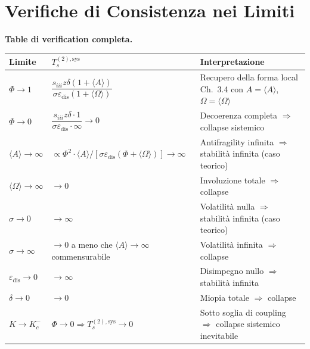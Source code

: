 \section{Verifiche di Consistenza nei
Limiti}\label{verifiche-di-consistenza-nei-limiti}

\Proved{} \textbf{Table di verification completa.}

{\def\LTcaptype{none} %
{\small\begin{longtable}[]{@{}
  >{\raggedright\arraybackslash}p{}
  >{\raggedright\arraybackslash}p{}
  >{\raggedright\arraybackslash}p{}@{}}
\toprule\noalign{}
\begin{minipage}[b]{\linewidth}\raggedright
Limite
\end{minipage} & \begin{minipage}[b]{\linewidth}\raggedright
\(T_s^{(2),\text{sys}}\)
\end{minipage} & \begin{minipage}[b]{\linewidth}\raggedright
Interpretazione
\end{minipage} \\
\midrule\noalign{}
\endhead
\bottomrule\noalign{}
\endlastfoot
\(\Phi \to 1\) &
\(\dfrac{s_{iii}z\delta(1+\langle A\rangle)}{\sigma\varepsilon_{\text{dis}}(1+\langle\Omega\rangle)}\)
& Recupero della forma local Ch.~3.4 con \(A=\langle A\rangle\),
\(\Omega=\langle\Omega\rangle\) \Proved{} \\
\(\Phi \to 0\) &
\(\dfrac{s_{iii}z\delta \cdot 1}{\sigma\varepsilon_{\text{dis}} \cdot \infty} \to 0\)
& Decoerenza completa \(\Rightarrow\) collapse sistemico \Proved{} \\
\(\langle A\rangle \to \infty\) &
\(\propto \Phi^2 \cdot \langle A\rangle / [\sigma\varepsilon_{\text{dis}}(\Phi+\langle\Omega\rangle)] \to \infty\)
& Antifragility infinita \(\Rightarrow\) stabilità infinita (caso
teorico) \Proved{} \\
\(\langle\Omega\rangle \to \infty\) & \(\to 0\) & Involuzione totale
\(\Rightarrow\) collapse \Proved{} \\
\(\sigma \to 0\) & \(\to \infty\) & Volatilità nulla \(\Rightarrow\)
stabilità infinita (caso teorico) \Proved{} \\
\(\sigma \to \infty\) & \(\to 0\) a meno che
\(\langle A\rangle \to \infty\) commensurabile & Volatilità infinita
\(\Rightarrow\) collapse \Proved{} \\
\(\varepsilon_{\text{dis}} \to 0\) & \(\to \infty\) & Disimpegno nullo
\(\Rightarrow\) stabilità infinita \Proved{} \\
\(\delta \to 0\) & \(\to 0\) & Miopia totale \(\Rightarrow\) collapse
\Proved{} \\
\(K \to K_c^-\) & \(\Phi \to 0 \Rightarrow T_s^{(2),\text{sys}} \to 0\)
& Sotto soglia di coupling \(\Rightarrow\) collapse sistemico
inevitabile \Proved{} \\
\end{longtable}}
}

